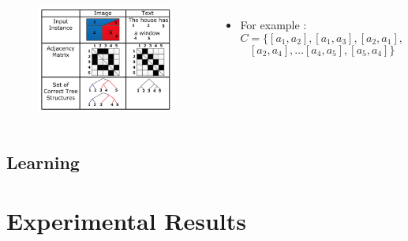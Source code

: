 \documentclass{beamer}
\begin{document}
\frame
{
	\begin{columns}
	\begin{figure}[ht]  
		\begin{center}
			\includegraphics[width=2.1in]{images/fig3.png}   
		\end{center}   
	\end{figure}
	\begin{itemize}
		\item For example :
		$$ C = \{[a_1, a_2], [a_1, a_3], [a_2, a_1], $$ 
		$$ [a_2, a_4], \dots  [a_4,a_5], [a_5, a_4]\} $$
	\end{itemize}
	\end{columns}
}
\subsection{Learning}
\frame
{
}
\section{Experimental Results}
\end{document}

